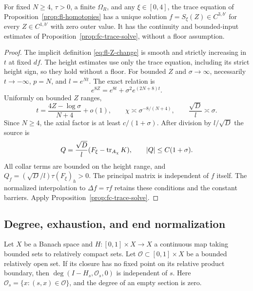 \begin{corollary}
\label{cor:fc-flat-trace-solve}
For fixed $N\ge4$, $\tau>0$, a finite $\Omega_R$, and any
$\xi\in[0,4]$, the trace equation of
Proposition~\ref{prop:fl-homotopies} has a unique solution
$f=S_\xi(Z)\in C^{3,b'}$ for every $Z\in C^{1,b'}$ with zero outer
value.  It has the continuity and bounded-input estimates of
Proposition~\ref{prop:fc-trace-solve}, without a floor assumption.
\end{corollary}

\begin{proof}
The implicit definition \eqref{eq:fl-Z-change} is smooth and
strictly increasing in $t$ at fixed $df$.
The height estimates use only the trace equation, including its
strict height sign, so they hold without a floor.  For bounded
$Z$ and $\sigma\to\infty$, necessarily $t\to-\infty$,
$p=N$, and $l=e^{Nt}$.  The exact relation is
\[
 e^{8Z}=e^{8t}+\sigma^2e^{(2N+8)t}.
\]
Uniformly on bounded $Z$ ranges,
\begin{equation}\label{eq:fc-no-floor-asymptotics}
 t=\frac{4Z-\log\sigma}{N+4}+o(1),\qquad
 \chi\asymp\sigma^{-8/(N+4)},\qquad
 \frac{\sqrt D}{l}\asymp\sigma.
\end{equation}
Since $N\ge4$, the axial factor is at least $c/(1+\sigma)$.
After division by $l/\sqrt D$ the source is
\[
 Q=\frac{\sqrt D}{l}(F_\xi-\operatorname{tr}_{A_\chi}K),
 \qquad |Q|\le C(1+\sigma).
\]
All collar terms are bounded on the height range, and
$Q_f=(\sqrt D/l)\tau(F_\xi)_h>0$.
The principal matrix is independent of $f$ itself.  The normalized
interpolation to $\Delta f=\tau f$ retains these conditions and
the constant barriers.  Apply
Proposition~\ref{prop:fc-trace-solve}.
\end{proof}

\subsection{Degree, exhaustion, and end normalization}

\begin{lemma}\label{lem:fc-moving-degree}
Let $X$ be a Banach space and $H:[0,1]\times X\to X$ a continuous
map taking bounded sets to relatively compact sets.  Let
$\mathcal O\subset[0,1]\times X$ be a bounded relatively open
set.  If its closure has no fixed point on its relative product
boundary, then
$\deg(I-H_s,\mathcal O_s,0)$ is independent of $s$.
Here $\mathcal O_s=\{x:(s,x)\in\mathcal O\}$, and the degree of
an empty section is zero.
\end{lemma}

